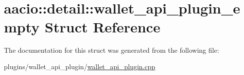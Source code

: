 \hypertarget{structaacio_1_1detail_1_1wallet__api__plugin__empty}{}\section{aacio\+:\+:detail\+:\+:wallet\+\_\+api\+\_\+plugin\+\_\+empty Struct Reference}
\label{structaacio_1_1detail_1_1wallet__api__plugin__empty}


The documentation for this struct was generated from the following file\+:\begin{DoxyCompactItemize}
\item 
plugins/wallet\+\_\+api\+\_\+plugin/\mbox{\hyperlink{wallet__api__plugin_8cpp}{wallet\+\_\+api\+\_\+plugin.\+cpp}}\end{DoxyCompactItemize}
